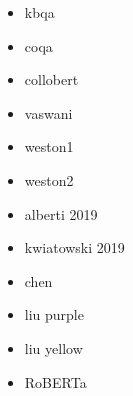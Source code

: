 \documentclass[11pt,hidelinks]{article}
\begin{document}
\begin{itemize}
  \item kbqa~\cite{kbqa}    
  \item coqa~\cite{coqa}
  \item collobert~\cite{Collobert}
  \item vaswani~\cite{vaswani}
  \item weston1~\cite{weston-tracking}
  \item weston2~\cite{weston-reading}
  \item alberti 2019~\cite{alberti}
  \item kwiatowski 2019~\cite{kwiatowski}
  \item chen~\cite{chen}
  \item liu purple~\cite{liu-purple}
  \item liu yellow~\cite{liu-yellow}
  \item RoBERTa~\cite{roberta}
\end{itemize}




\end{document}
